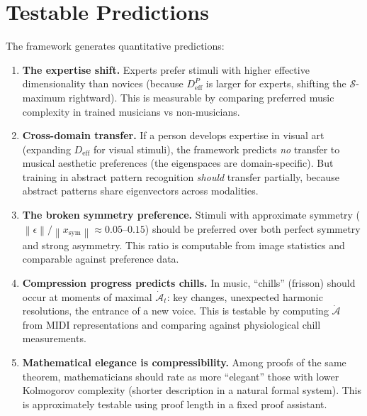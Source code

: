 \documentclass[journal]{IEEEtran}
\newcommand{\norm}[1]{\left\lVert #1 \right\rVert}
\begin{document}
\section{Testable Predictions}
\label{sec:predictions}

The framework generates quantitative predictions:

\begin{enumerate}
    \item \textbf{The expertise shift.}  Experts prefer stimuli with
    higher effective dimensionality than novices (because
    $D_{\mathrm{eff}}^P$ is larger for experts, shifting the
    $\mathcal{S}$-maximum rightward).  This is measurable by
    comparing preferred music complexity in trained musicians vs
    non-musicians.

    \item \textbf{Cross-domain transfer.}  If a person develops
    expertise in visual art (expanding $D_{\mathrm{eff}}$ for visual
    stimuli), the framework predicts \emph{no} transfer to musical
    aesthetic preferences (the eigenspaces are domain-specific).  But
    training in abstract pattern recognition \emph{should} transfer
    partially, because abstract patterns share eigenvectors across
    modalities.

    \item \textbf{The broken symmetry preference.}  Stimuli with
    approximate symmetry ($\norm{\epsilon} / \norm{x_{\mathrm{sym}}}
    \approx 0.05$--$0.15$) should be preferred over both perfect
    symmetry and strong asymmetry.  This ratio is computable from
    image statistics and comparable against preference data.

    \item \textbf{Compression progress predicts chills.}
    In music, ``chills'' (frisson) should occur at moments of maximal
    $\dot{\mathcal{A}}_t$: key changes, unexpected harmonic
    resolutions, the entrance of a new voice.  This is testable by
    computing $\dot{\mathcal{A}}$ from MIDI representations and
    comparing against physiological chill measurements.

    \item \textbf{Mathematical elegance is compressibility.}
    Among proofs of the same theorem, mathematicians should rate as
    more ``elegant'' those with lower Kolmogorov complexity (shorter
    description in a natural formal system).  This is approximately
    testable using proof length in a fixed proof assistant.
\end{enumerate}
\end{document}
